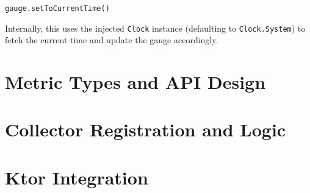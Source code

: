 \begin{verbatim}
gauge.setToCurrentTime()
\end{verbatim}

Internally, this uses the injected \texttt{Clock} instance (defaulting to \texttt{Clock.System}) to fetch the current time and update the gauge accordingly.





\section{Metric Types and API Design}
\lipsum[1]


\section{Collector Registration and Logic}
\lipsum[1]


\section{Ktor Integration}
\lipsum[1]
